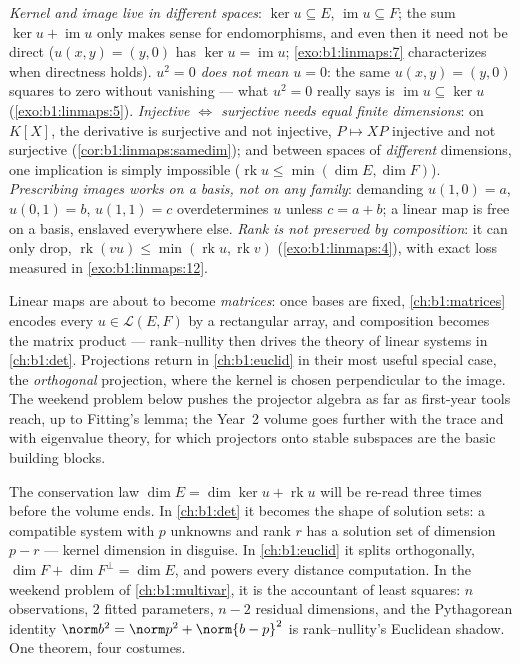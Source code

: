 \begin{remark}
\label{rem:b1:linmaps:pitfalls}
\emph{Kernel and image live in different spaces}: $\ker u
\subseteq E$, $\operatorname{im} u \subseteq F$; the sum $\ker u
+ \operatorname{im} u$ only makes sense for endomorphisms, and
even then it need not be direct ($u(x, y) = (y, 0)$ has $\ker u
= \operatorname{im} u$; \cref{exo:b1:linmaps:7} characterizes
when directness holds).
\emph{$u^2 = 0$ does not mean $u = 0$}: the same $u(x,y) =
(y, 0)$ squares to zero without vanishing --- what $u^2 = 0$
really says is $\operatorname{im} u \subseteq \ker u$
(\cref{exo:b1:linmaps:5}).
\emph{Injective $\iff$ surjective needs equal finite
dimensions}: on $K[X]$, the derivative is surjective and not
injective, $P \mapsto XP$ injective and not surjective
(\cref{cor:b1:linmaps:samedim}); and between spaces of
\emph{different} dimensions, one implication is simply
impossible ($\operatorname{rk} u \leq \min(\dim E, \dim F)$).
\emph{Prescribing images works on a basis, not on any family}:
demanding $u(1, 0) = a$, $u(0, 1) = b$, $u(1, 1) = c$
overdetermines $u$ unless $c = a + b$; a linear map is free on a
basis, enslaved everywhere else.
\emph{Rank is not preserved by composition}: it can only drop,
$\operatorname{rk}(vu) \leq \min(\operatorname{rk} u,
\operatorname{rk} v)$ (\cref{exo:b1:linmaps:4}), with exact loss
measured in \cref{exo:b1:linmaps:12}.
\end{remark}

\begin{remark}
\label{rem:b1:linmaps:whereused}
Linear maps are about to become \emph{matrices}: once bases are
fixed, \cref{ch:b1:matrices} encodes every $u \in \mathcal{L}(E,
F)$ by a rectangular array, and composition becomes the matrix
product --- rank--nullity then drives the theory of linear
systems in \cref{ch:b1:det}. Projections return in
\cref{ch:b1:euclid} in their most useful special case, the
\emph{orthogonal} projection, where the kernel is chosen
perpendicular to the image. The weekend problem below pushes the
projector algebra as far as first-year tools reach, up to
Fitting's lemma; the Year~2 volume goes further with the trace
and with eigenvalue theory, for which projectors onto stable
subspaces are the basic building blocks.
\end{remark}

\begin{remark}
\label{rem:b1:linmaps:perspectives}
The conservation law $\dim E = \dim\ker u + \operatorname{rk} u$
will be re-read three times before the volume ends. In
\cref{ch:b1:det} it becomes the shape of solution sets: a
compatible system with $p$ unknowns and rank $r$ has a solution
set of dimension $p - r$ --- kernel dimension in disguise. In
\cref{ch:b1:euclid} it splits orthogonally, $\dim F + \dim
F^\perp = \dim E$, and powers every distance computation. In
the weekend problem of \cref{ch:b1:multivar}, it is the
accountant of least squares: $n$ observations, $2$ fitted
parameters, $n - 2$ residual dimensions, and the Pythagorean
identity $\norm b^2 = \norm p^2 + \norm{b - p}^2$ is
rank--nullity's Euclidean shadow. One theorem, four costumes.
\end{remark}

